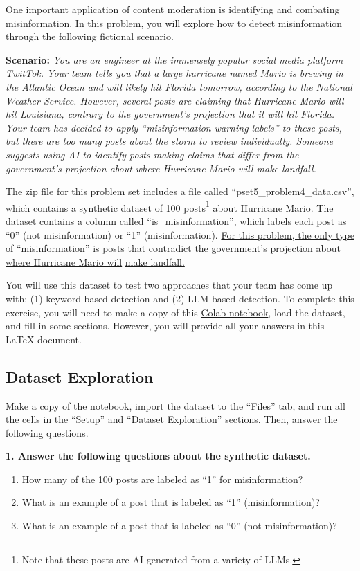 \documentclass{article}
\begin{document}
\bigskip 

One important application of content moderation is identifying and combating misinformation. In this problem, you will explore how to detect misinformation through the following fictional scenario.

\textbf{Scenario:} \textit{You are an engineer at the immensely popular social media platform TwitTok. Your team tells you that a large hurricane named Mario is brewing in the Atlantic Ocean and will likely hit Florida tomorrow, according to the National Weather Service. However, several posts are claiming that Hurricane Mario will hit Louisiana, contrary to the government's projection that it will hit Florida. Your team has decided to apply ``misinformation warning labels'' to these posts, but there are too many posts about the storm to review individually. Someone suggests using AI to identify posts making claims that differ from the government's projection about where Hurricane Mario will make landfall.}  

The zip file for this problem set includes a file called ``pset5\_problem4\_data.csv'', which contains a synthetic dataset of 100 posts\footnote{Note that these posts are AI-generated from a variety of LLMs.} about Hurricane Mario. The dataset contains a column called ``is\_misinformation'', which labels each post as ``0'' (not misinformation) or ``1'' (misinformation). \underline{For this problem, the only type} \underline{of ``misinformation'' is posts that contradict the government's projection about where Hurricane Mario will} \underline{make landfall.}

You will use this dataset to test two approaches that your team has come up with: (1) keyword-based detection and (2) LLM-based detection. To complete this exercise, you will need to make a copy of this \href{https://colab.research.google.com/drive/1pZC2LMDyifEAHFYKrN4kwJ1XWZrH2NSD?usp=sharing}{Colab notebook}, load the dataset, and fill in some sections. However, you will provide all your answers in this LaTeX document. 

\subsection*{Dataset Exploration}

Make a copy of the notebook, import the dataset to the ``Files'' tab, and run all the cells in the ``Setup'' and ``Dataset Exploration'' sections. Then, answer the following questions.

\textbf{1. Answer the following questions about the synthetic dataset.}
\begin{enumerate}[label=\Alph*.]
    \item How many of the 100 posts are labeled as ``1'' for misinformation?
    \item What is an example of a post that is labeled as ``1'' (misinformation)?
    \item What is an example of a post that is labeled as ``0'' (not misinformation)?
\end{enumerate}
\end{document}
